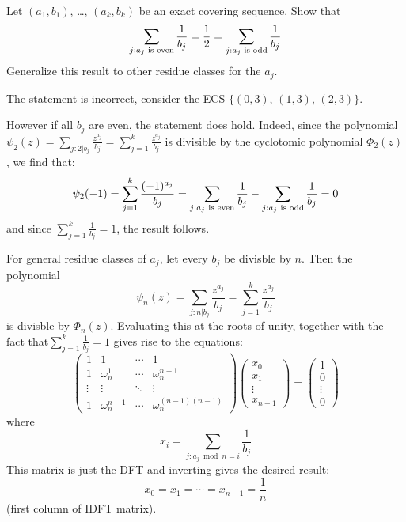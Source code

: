 \begin{exercise}
    Let $(a_1, b_1)$, \ldots, $(a_k, b_k)$ be an exact covering sequence. Show that 
    \[
        \sum_{j : a_j \textnormal{ is even}} \frac{1}{b_j} = \frac{1}{2} = \sum_{j : a_j \textnormal{ is odd}} \frac{1}{b_j}
    \]
    Generalize this result to other residue classes for the $a_j$.
\end{exercise}
\begin{solution}
    The statement is incorrect, consider the ECS $\{(0, 3)$, $(1, 3)$, $(2, 3)\}$.

    However if all $b_j$ are even, the statement does hold. Indeed, since the polynomial $\psi_2(z) = \sum_{j:2\vert b_j} \frac{z^{a_j}}{b_j} = \sum_{j=1}^k \frac{z^{a_j}}{b_j}$ is divisible by the cyclotomic polynomial $\Phi_2(z)$, we find that:
    \[
        \psi_2(-1) = \sum_{j=1}^k \frac{(-1)^{a_j}}{b_j} = \sum_{j:a_j \textnormal{ is even}} \frac{1}{b_j} -  \sum_{j:a_j \textnormal{ is odd}} \frac{1}{b_j} = 0
    \]
    and since $\sum_{j=1}^k \frac{1}{b_j} = 1$, the result follows.

    For general residue classes of $a_j$, let every $b_j$ be divisble by $n$. Then the polynomial
    \[
        \psi_n(z) = \sum_{j:n \vert b_j} \frac{z^{a_j}}{b_j} = \sum_{j=1}^k \frac{z^{a_j}}{b_j}
    \]
    is divisble by $\Phi_n(z)$. Evaluating this at the roots of unity, together with the fact that$ \sum_{j=1}^k \frac{1}{b_j} = 1$ gives rise to the equations:
    \[
        \begin{pmatrix}
            1 & 1 & \cdots & 1 \\
            1 & \omega_n^1 & \cdots & \omega_n^{n-1} \\
            \vdots & \vdots &\ddots & \vdots \\
            1 & \omega_n^{n-1} & \cdots & \omega_n^{(n-1)(n-1)}
        \end{pmatrix} \begin{pmatrix}
            x_0 \\ x_1 \\ \vdots \\ x_{n-1}
        \end{pmatrix} = \begin{pmatrix}
            1 \\ 0 \\ \vdots \\ 0
        \end{pmatrix}
    \]
    where
    \[
        x_i = \sum_{j: a_j \bmod n = i} \frac{1}{b_j}
    \]
    This matrix is just the DFT and inverting gives the desired result:
    \[
        x_0 = x_1 = \cdots = x_{n-1} = \frac{1}{n}
    \]
    (first column of IDFT matrix).
\end{solution}

